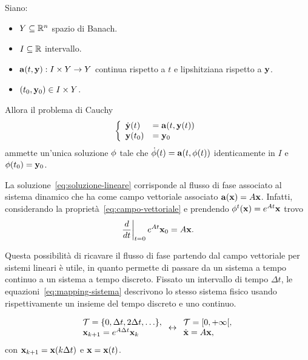 \begin{thm}
    Siano:
    \begin{itemize}
        \item $Y \subseteq \mathbb{R}^n$ spazio di Banach.%
        \item $I \subseteq \mathbb{R}$ intervallo.%
        \item $\mathbf{a}(t, \mathbf{y}) : I \times Y \to Y$ continua rispetto a $t$ e lipshitziana rispetto a $\mathbf{y}$.%
        \item $(t_0, \mathbf{y}_0) \in I \times Y$.
    \end{itemize}
    Allora il problema di Cauchy
    \begin{equation*}
        \left\{
            \begin{array}{ll}
                \dot{\mathbf{y}}(t) &= \mathbf{a}(t, \mathbf{y} (t)) \\
                \mathbf{y} (t_0) &= \mathbf{y}_0
            \end{array}
        \right.
    \end{equation*}
    ammette un'unica soluzione $\mathbf{\phi}$ tale che $\dot {\mathbf{\phi}}(t) = \mathbf{a}(t, \mathbf{\phi}(t))$
    identicamente in $I$ e $\mathbf{\phi}(t_0) = \mathbf{y}_0$.
    \label{thm:esistenza-unicità}
\end{thm}

La soluzione~\eqref{eq:soluzione-lineare}
corrisponde al flusso di fase associato al sistema dinamico che ha come campo vettoriale
associato $\mathbf{a}(\mathbf{x}) = A\mathbf{x}$.
Infatti, considerando la proprietà~\eqref{eq:campo-vettoriale} e prendendo
$\phi^t(\mathbf{x}) = e^{At} \mathbf{x}$ trovo
\begin{equation*}
        \left. \frac d{dt} \right|_{t=0} e^{At} \mathbf{x}_0 = A \mathbf{x}.
\end{equation*}


Questa possibilità di ricavare il flusso di fase partendo dal campo vettoriale per
sistemi lineari è utile, in quanto permette di passare da un sistema a tempo continuo
a un sistema a tempo discreto.
Fissato un intervallo di tempo $\Delta t$, le equazioni~\eqref{eq:mapping-sistema} descrivono lo stesso sistema fisico usando
rispettivamente un insieme del tempo discreto e uno continuo.

\begin{equation}
    \begin{array}{l}
        \mathcal T = \{0, \Delta t, 2\Delta t, \ldots\}, \\
        \mathbf{x}_{k+1} = e^{A \Delta t} \mathbf{x}_k
    \end{array}
        \leftrightarrow
    \begin{array}{l}
        \mathcal T = [0, +\infty [, \\
        \dot{\mathbf{x}} = A \mathbf{x},
    \end{array}
    \label{eq:mapping-sistema}
\end{equation}
con $\mathbf{x}_{k+1} = \mathbf{x}(k\Delta t)$ e $\mathbf{x} = \mathbf{x}(t)$.

